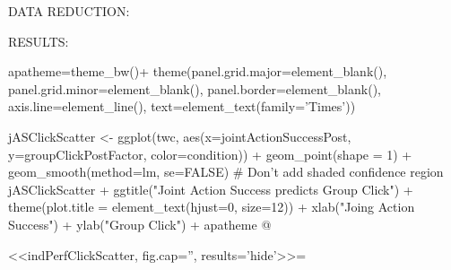 DATA REDUCTION:









RESULTS:



apatheme=theme_bw()+
  theme(panel.grid.major=element_blank(),
        panel.grid.minor=element_blank(),
        panel.border=element_blank(),
        axis.line=element_line(),
        text=element_text(family='Times'))

jASClickScatter <- ggplot(twc, aes(x=jointActionSuccessPost, y=groupClickPostFactor,
                            color=condition)) + geom_point(shape = 1) +
                            geom_smooth(method=lm, se=FALSE)   # Don't add shaded confidence region
jASClickScatter +
            ggtitle("Joint Action Success predicts Group Click") +
            theme(plot.title = element_text(hjust=0, size=12)) +
            xlab("Joing Action Success") +
            ylab("Group Click") +
            apatheme
@

<<indPerfClickScatter, fig.cap='', results='hide'>>=

